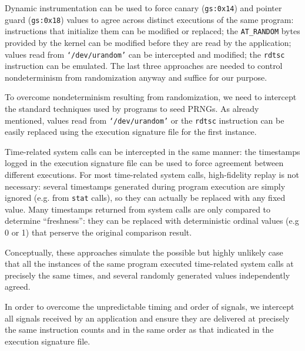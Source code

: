  \newline
Dynamic instrumentation can be used to force canary (\texttt{gs:0x14})
and pointer guard (\texttt{gs:0x18}) values
to agree across distinct executions of the same program:
instructions that initialize them can be
modified or replaced; the \texttt{AT\_RANDOM} bytes 
provided by the kernel can be
modified before they are read by the application; 
values read from \texttt{`/dev/urandom'} can be 
intercepted and modified; the \texttt{rdtsc} instruction can be emulated.
The last three approaches are needed to control nondeterminism
from randomization anyway and suffice for our purpose. \newline

 \newline
To overcome nondeterminism resulting from randomization,
we need to intercept the standard techniques
used by programs to seed PRNGs.
As already mentioned, values read from \texttt{`/dev/urandom'}
or the \texttt{rdtsc} instruction can be easily replaced
using the execution signature file for the first instance.

Time-related system calls can
be intercepted in the same manner:
the timestamps logged
in the execution signature file
can be used to force agreement
between different executions.
For most time-related system calls,
high-fidelity replay is not necessary:
several timestamps generated
during program execution are simply ignored
(e.g. from \texttt{stat} calls),
so they can actually be replaced with any 
fixed value. Many timestamps
returned from system calls are only compared to
determine ``freshness'': they
can be replaced with deterministic ordinal values (e.g 0 or 1) that 
perserve the original comparison result.

Conceptually, these approaches simulate the possible but highly
unlikely case that all the instances of the same program
executed time-related system calls
at precisely the same times,
and several randomly generated values independently agreed. \newline

 \newline
In order to overcome the unpredictable timing and 
order of signals, we intercept all signals received by 
an application and ensure they are delivered
at precisely the same instruction counts
and in the same order as that indicated
in the execution signature file.

